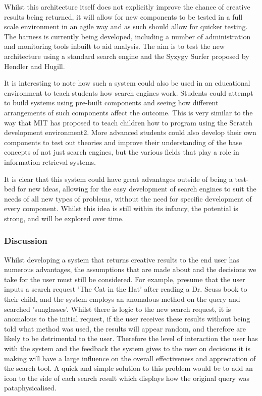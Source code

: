 Whilst this architecture itself does not explicitly improve the chance of creative results being returned, it will allow for new components to be tested in a full scale environment in an agile way and as such should allow for quicker testing. The harness is currently being developed, including a number of administration and monitoring tools inbuilt to aid analysis. The aim is to test the new architecture using a standard search engine and the Syzygy Surfer proposed by Hendler and Hugill\citep{Hendler2011}.

It is interesting to note how such a system could also be used in an educational environment to teach students how search engines work. Students could attempt to build systems using pre-built components and seeing how different arrangements of such components affect the outcome. This is very similar to the way that MIT has proposed to teach children how to program using the Scratch development environment2. More advanced students could also develop their own components to test out theories and improve their understanding of the base concepts of not just search engines, but the various fields that play a role in information retrieval systems.

It is clear that this system could have great advantages outside of being a test-bed for new ideas, allowing for the easy development of search engines to suit the needs of all new types of problems, without the need for specific development of every component. Whilst this idea is still within its infancy, the potential is strong, and will be explored over time.

\subsubsection{Discussion}

Whilst developing a system that returns creative results to the end user has numerous advantages, the assumptions that are made about and the decisions we take for the user must still be considered. For example, presume that the user inputs a search request 'The Cat in the Hat' after reading a Dr. Seuss book to their child, and the system employs an anomalous method on the query and searched 'sunglasses'. Whilst there is logic to the new search request, it is anomalous to the initial request, if the user receives these results without being told what method was used, the results will appear random, and therefore are likely to be detrimental to the user. Therefore the level of interaction the user has with the system and the feedback the system gives to the user on decisions it is making will have a large influence on the overall effectiveness and appreciation of the search tool. A quick and simple solution to this problem would be to add an icon to the side of each search result which displays how the original query was pataphysicalised.

